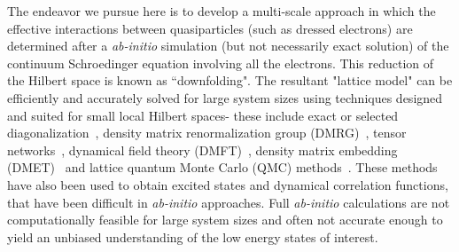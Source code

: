 \documentclass[prl,12pt,onecolumn,nofootinbib,notitlepage,english,superscriptaddress]{revtex4-1}
\newcommand{\HJC}[1]{{\color{RED}{\bf HJC: #1}}}
\begin{document}

The endeavor we pursue here is to develop a multi-scale approach in which the effective interactions between 
quasiparticles (such as dressed electrons) are determined after a \emph{ab-initio} simulation (but not necessarily exact 
solution) of the continuum Schroedinger equation involving all the electrons. This reduction 
of the Hilbert space is known as ``downfolding". The resultant "lattice model" can be efficiently and accurately 
solved for large system sizes using techniques designed and suited for small local Hilbert spaces- these include 
exact or selected diagonalization~\cite{DeRaedt,Holmes_Tubman_Umrigar}, density matrix renormalization group 
(DMRG)~\cite{White1992}, tensor networks~\cite{PEPS,Changlani_CPS,NeuscammanCPS}, 
dynamical field theory (DMFT)~\cite{}, density matrix embedding (DMET)~\cite{DMET_2012} and 
lattice quantum Monte Carlo (QMC) methods~\cite{Scalapino, Trivedi_Ceperley, Zhang_AFQMC, Sandvik_loops, Prokofiev, 
Booth2009,SQMC,Holmes_Changlani_Umrigar, Booth2013}. These methods have also been used to obtain 
excited states and dynamical correlation functions, that have been difficult in \emph{ab-initio} approaches. 
Full \emph{ab-initio} calculations are not computationally feasible for large system sizes 
and often not accurate enough to yield an unbiased understanding of the low energy states of interest. 
\end{document}
